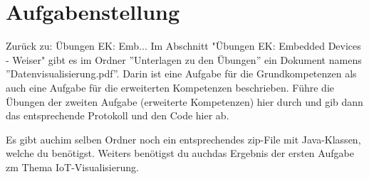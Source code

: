 \section{Aufgabenstellung}
Zurück zu: Übungen EK: Emb...
Im Abschnitt "Übungen EK: Embedded Devices - Weiser" gibt es im Ordner ''Unterlagen zu den Übungen'' ein Dokument namens ''Datenvisualisierung.pdf''. Darin ist eine Aufgabe für die Grundkompetenzen als auch eine Aufgabe für die erweiterten Kompetenzen beschrieben. Führe die Übungen der zweiten Aufgabe (erweiterte Kompetenzen) hier durch und gib dann das entsprechende Protokoll und den Code hier ab.

Es gibt auchim selben Ordner noch ein entsprechendes zip-File mit Java-Klassen, welche du benötigst. Weiters benötigst du auchdas Ergebnis der ersten Aufgabe zm Thema IoT-Visualisierung.
\clearpage
